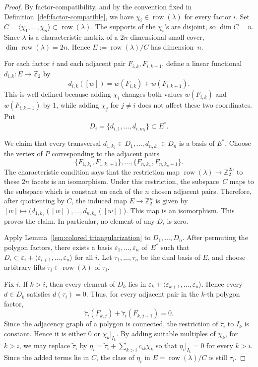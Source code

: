 \documentclass[10pt,a4paper]{amsart}
\newcommand{\Z}{\mathbb Z}
\DeclareMathOperator{\row}{row}
\begin{document}
\begin{proof}
    By factor-compatibility, and by the convention fixed in Definition~\ref{def:factor-compatible}, we have $\chi_i\in\row(\lambda)$ for every factor $i$.
    Set $C=\langle \chi_1,\ldots,\chi_n\rangle\subset \row(\lambda)$.
    The supports of the $\chi_i$'s are disjoint, so $\dim C=n$.
    Since $\lambda$ is a characteristic matrix of a $2n$-dimensional small cover, $\dim \row(\lambda)=2n$.
    Hence $E:=\row(\lambda)/C$ has dimension~$n$.
        
    For each factor $i$ and each adjacent pair $F_{i,k},F_{i,k+1}$, define a linear functional $d_{i,k} \colon E\to \Z_2$ by
    $$
        d_{i,k}([w])=w(F_{i,k})+w(F_{i,k+1}).
    $$
    This is well-defined because adding $\chi_i$ changes both values $w(F_{i,k})$ and $w(F_{i,k+1})$ by $1$, while adding $\chi_j$ for $j\neq i$ does not affect these two coordinates.
    Put
    $$
            D_i=\{d_{i,1},\ldots,d_{i,m_i}\}\subset E^\ast.
    $$
        
    We claim that every transversal $d_{1,k_1}\in D_1,\ldots,d_{n,k_n}\in D_n$ is a basis of $E^\ast$.
    Choose the vertex of $P$ corresponding to the adjacent pairs
    $$
        \{F_{1,k_1},F_{1,k_1+1}\},\ldots,\{F_{n,k_n},F_{n,k_n+1}\}.
    $$
    The characteristic condition says that the restriction map $\row(\lambda)\to \Z_2^{2n}$ to these $2n$ facets is an isomorphism.
    Under this restriction, the subspace~$C$ maps to the subspace which is constant on each of the $n$ chosen adjacent pairs.
    Therefore, after quotienting by $C$, the induced map $E \to \Z_2^n$ is given by $[w]\mapsto \bigl(d_{1,k_1}([w]),\ldots,d_{n,k_n}([w])\bigr)$.
    This map is an isomorphism.
    This proves the claim.
    In particular, no element of any $D_i$ is zero.
        
    Apply Lemma~\ref{lem:colored triangularization} to $D_1,\ldots,D_n$.
    After permuting the polygon factors, there exists a basis $\varepsilon_1,\ldots,\varepsilon_n$ of~$E^\ast$ such that $D_i\subset\varepsilon_i+\langle \varepsilon_{i+1},\ldots,\varepsilon_n\rangle$ for all $i$.
    Let $\tau_1,\ldots,\tau_n$ be the dual basis of $E$, and choose arbitrary lifts $\widetilde\tau_i\in \row(\lambda)$ of $\tau_i$.
        
    Fix $i$.
    If $k>i$, then every element of $D_k$ lies in $\varepsilon_k+\langle\varepsilon_{k+1},\ldots,\varepsilon_n\rangle$.
    Hence every $d\in D_k$ satisfies $d(\tau_i)=0$.
    Thus, for every adjacent pair in the $k$-th polygon factor,
    $$
        \widetilde\tau_i(F_{k,j})+\widetilde\tau_i(F_{k,j+1})=0.
    $$
    Since the adjacency graph of a polygon is connected, the restriction of $\widetilde\tau_i$ to $I_k$ is constant.
    Hence it is either $0$ or $\chi_k|_{I_k}$.
    By adding suitable multiples of $\chi_k$, for~$k>i$, we may replace $\widetilde\tau_i$ by $\eta_i=\widetilde\tau_i+\sum_{k>i} c_{ik}\chi_k$ so that $\eta_i|_{I_k}=0$ for every $k>i$.
    Since the added terms lie in $C$, the class of $\eta_i$ in $E=\row(\lambda)/C$ is still $\tau_i$.
        

\end{proof}
\end{document}
